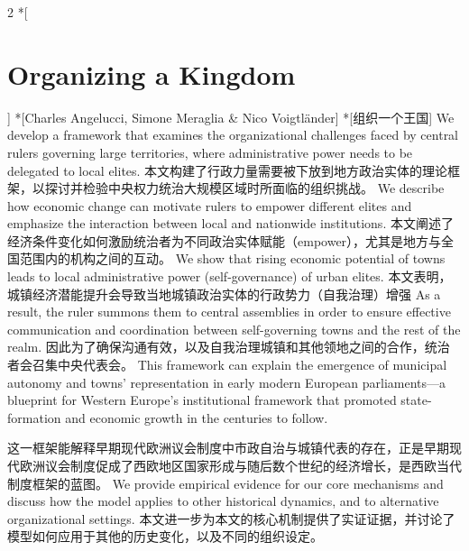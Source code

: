 \documentclass[cn,hazy,blue,14pt,screen]{elegantnote}
\begin{document}
\begin{paracol}{2}
	\switchcolumn[0]*[\section{Organizing a Kingdom}]
	\switchcolumn[0]*[Charles Angelucci, Simone Meraglia \& Nico Voigtländer]
	\switchcolumn[0]*[组织一个王国]
	We develop a framework that examines the organizational challenges faced by central rulers governing large territories, where administrative power needs to be delegated to local elites. 
	\switchcolumn
	本文构建了行政力量需要被下放到地方政治实体的理论框架，以探讨并检验中央权力统治大规模区域时所面临的组织挑战。
	\switchcolumn*
	We describe how economic change can motivate rulers to empower different elites and emphasize the interaction between local and nationwide institutions.
	\switchcolumn
	本文阐述了经济条件变化如何激励统治者为不同政治实体赋能（empower），尤其是地方与全国范围内的机构之间的互动。
	\switchcolumn*
	We show that rising economic potential of towns leads to local administrative power (self-governance) of urban elites. 
	\switchcolumn
	本文表明，城镇经济潜能提升会导致当地城镇政治实体的行政势力（自我治理）增强
	\switchcolumn*
	As a result, the ruler summons them to central assemblies in order to ensure effective communication and coordination between self-governing towns and the rest of the realm. 	
	\switchcolumn
	因此为了确保沟通有效，以及自我治理城镇和其他领地之间的合作，统治者会召集中央代表会。
	\switchcolumn*
	This framework can explain the emergence of municipal autonomy and towns’ representation in early modern European parliaments—a blueprint for Western Europe’s institutional framework that promoted state-formation and economic growth in the centuries to follow.
	
	\switchcolumn
	这一框架能解释早期现代欧洲议会制度中市政自治与城镇代表的存在，正是早期现代欧洲议会制度促成了西欧地区国家形成与随后数个世纪的经济增长，是西欧当代制度框架的蓝图。
	\switchcolumn*
	We provide empirical evidence for our core mechanisms and discuss how the model applies to other historical dynamics, and to alternative organizational settings.
	\switchcolumn
	本文进一步为本文的核心机制提供了实证证据，并讨论了模型如何应用于其他的历史变化，以及不同的组织设定。
	
\end{paracol}
\end{document}
